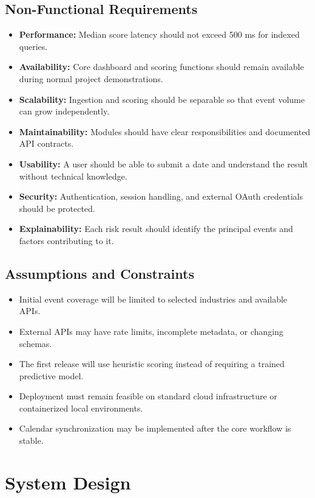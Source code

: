 \documentclass[12pt]{article}
\begin{document}
\subsection{Non-Functional Requirements}
\begin{itemize}[leftmargin=0.7cm]
\item \textbf{Performance:} Median score latency should not exceed 500 ms for indexed queries.
\item \textbf{Availability:} Core dashboard and scoring functions should remain available during normal project demonstrations.
\item \textbf{Scalability:} Ingestion and scoring should be separable so that event volume can grow independently.
\item \textbf{Maintainability:} Modules should have clear responsibilities and documented API contracts.
\item \textbf{Usability:} A user should be able to submit a date and understand the result without technical knowledge.
\item \textbf{Security:} Authentication, session handling, and external OAuth credentials should be protected.
\item \textbf{Explainability:} Each risk result should identify the principal events and factors contributing to it.
\end{itemize}

\subsection{Assumptions and Constraints}
\begin{itemize}[leftmargin=0.7cm]
\item Initial event coverage will be limited to selected industries and available APIs.
\item External APIs may have rate limits, incomplete metadata, or changing schemas.
\item The first release will use heuristic scoring instead of requiring a trained predictive model.
\item Deployment must remain feasible on standard cloud infrastructure or containerized local environments.
\item Calendar synchronization may be implemented after the core workflow is stable.
\end{itemize}

\section{System Design}
\end{document}
